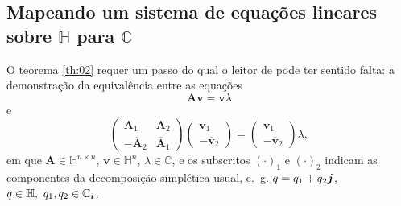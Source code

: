 \documentclass[
	11pt,				%
	openright,			%
	twoside,			%
	a4paper,			%
	french,				%
	brazil,			%
	english				%
	]{abntex2}
\begin{document}
\begin{apendicesenv}

\partapendices

\chapter{Mapeando um sistema de equa\c c\~oes lineares sobre $ \mathbb{H} $ para $ \mathbb{C} $}
\label{ch:AppendixA}

O teorema \ref{th:02} requer um passo do qual o leitor de \cite{zhang1997quaternions} pode ter sentido falta: a demonstra\c c\~ao da equival\^encia entre as equa\c c\~oes
\begin{equation}
\label{eq:A1}
\mathbf{A} \mathbf{v} = \mathbf{v} \lambda
\end{equation}
e
\begin{equation}
\begin{pmatrix}
\mathbf{A}_1 & \mathbf{A}_2\\ 
- \overline{\mathbf{A}}_2 & \overline{\mathbf{A}}_1
\end{pmatrix}
\begin{pmatrix}
\mathbf{v}_1 \\ 
- \overline{\mathbf{v}}_2
\end{pmatrix} =
\begin{pmatrix}
\mathbf{v}_1 \\ 
- \overline{\mathbf{v}}_2
\end{pmatrix}
\lambda,
\end{equation}
em que $ \mathbf{A} \in \mathbb{H}^{n \times n} $, $ \mathbf{v} \in \mathbb{H}^{n} $, $ \lambda \in \mathbb{C} $, e os subscritos $ (\cdot)_1 $ e $ (\cdot)_2 $ indicam as componentes da decomposi\c c\~ao simpl\'etica usual, e.~g. $ q = q_1 + q_2 \boldsymbol{j} $, $q\in \mathbb{H}, \ q_1, q_2 \in \mathbb{C}_{\boldsymbol{i}} $.


\end{apendicesenv}
\end{document}
